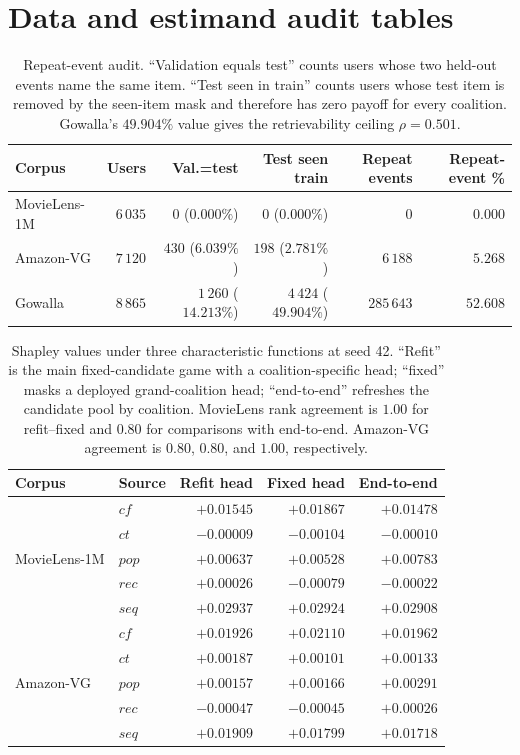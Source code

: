 \documentclass[10pt]{article}
\begin{document}
\clearpage
\section*{Data and estimand audit tables}

\begin{table}[H]
\centering
\small
\caption{Repeat-event audit. ``Validation equals test'' counts users whose two
held-out events name the same item. ``Test seen in train'' counts users whose
test item is removed by the seen-item mask and therefore has zero payoff for
every coalition. Gowalla's $49.904\%$ value gives the retrievability ceiling
$\rho=0.501$.}
\label{tab:repeat}
\begin{tabular}{@{}lrrrrr@{}}
\toprule
Corpus & Users & Val.=test & Test seen train & Repeat events & Repeat-event \% \\
\midrule
MovieLens-1M & $6\,035$ & $0$ ($0.000\%$) & $0$ ($0.000\%$) & $0$ & $0.000$ \\
Amazon-VG & $7\,120$ & $430$ ($6.039\%$) & $198$ ($2.781\%$) & $6\,188$ & $5.268$ \\
Gowalla & $8\,865$ & $1\,260$ ($14.213\%$) & $4\,424$ ($49.904\%$) & $285\,643$ & $52.608$ \\
\bottomrule
\end{tabular}
\end{table}

\begin{table}[H]
\centering
\small
\caption{Shapley values under three characteristic functions at seed 42.
``Refit'' is the main fixed-candidate game with a coalition-specific head;
``fixed'' masks a deployed grand-coalition head; ``end-to-end'' refreshes the
candidate pool by coalition. MovieLens rank agreement is $1.00$ for
refit--fixed and $0.80$ for comparisons with end-to-end. Amazon-VG agreement is
$0.80$, $0.80$, and $1.00$, respectively.}
\label{tab:estimands}
\begin{tabular}{@{}llrrr@{}}
\toprule
Corpus & Source & Refit head & Fixed head & End-to-end \\
\midrule
\multirow{5}{*}{MovieLens-1M}
 & $cf$ & $+0.01545$ & $+0.01867$ & $+0.01478$ \\
 & $ct$ & $-0.00009$ & $-0.00104$ & $-0.00010$ \\
 & $pop$ & $+0.00637$ & $+0.00528$ & $+0.00783$ \\
 & $rec$ & $+0.00026$ & $-0.00079$ & $-0.00022$ \\
 & $seq$ & $+0.02937$ & $+0.02924$ & $+0.02908$ \\
\midrule
\multirow{5}{*}{Amazon-VG}
 & $cf$ & $+0.01926$ & $+0.02110$ & $+0.01962$ \\
 & $ct$ & $+0.00187$ & $+0.00101$ & $+0.00133$ \\
 & $pop$ & $+0.00157$ & $+0.00166$ & $+0.00291$ \\
 & $rec$ & $-0.00047$ & $-0.00045$ & $+0.00026$ \\
 & $seq$ & $+0.01909$ & $+0.01799$ & $+0.01718$ \\
\bottomrule
\end{tabular}
\end{table}
\end{document}
